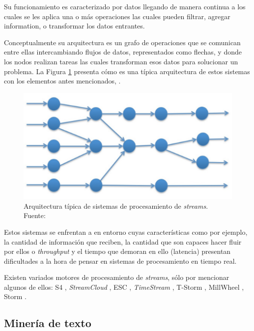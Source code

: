 Su funcionamiento es caracterizado por datos llegando de manera continua a los cuales se les aplica una o más operaciones las cuales pueden filtrar, agregar information, o transformar los datos entrantes.

Conceptualmente su arquitectura es un grafo de operaciones que se comunican entre ellas intercambiando flujos de datos, representados como flechas, y donde los nodos realizan tareas las cuales transforman esos datos para solucionar un problema. La Figura \ref{fig:ArqSPS} presenta cómo es una típica arquitectura de estos sistemas con los elementos antes mencionados, \citep{SPExplained}.

\begin{figure}[H]
	\centering
	\captionsetup{justification=centering}
	\includegraphics[scale=0.8]{images/ArqSPS.png}
	\caption[Arquitectura típica de sistemas de procesamiento de \textit{streams}.]{Arquitectura típica de sistemas de procesamiento de \textit{streams}.\\Fuente: \citep{SPExplained}}
	\label{fig:ArqSPS}
\end{figure}

Estos sistemas se enfrentan a en entorno cuyas características como por ejemplo, la cantidad de información que reciben, la cantidad que son capaces hacer fluir por ellos o \textit{throughput} y el tiempo que demoran en ello (latencia) presentan dificultades a la hora de pensar en sistemas de procesamiento en tiempo real.

Existen variados motores de procesamiento de \textit{streams}, sólo por mencionar algunos de ellos: S4 \citep{NeumeyerS4}, \textit{StreamCloud} \citep{GulisanoStreamCloud}, ESC \citep{SatzgerESC}, \textit{TimeStream} \citep{QianTimeStream}, T-Storm \citep{XuTStorm}, MillWheel \citep{AkidauMillWheel}, Storm \citep{StormFigure}.


\subsection{Minería de texto}
\label{subsec:MineriaTexto}

